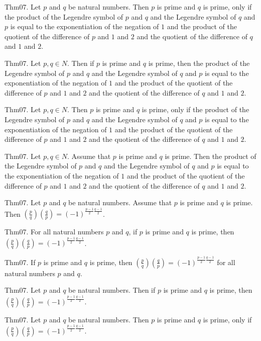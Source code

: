\documentclass{article}
\begin{document}
Thm07. Let $p$ and $q$ be natural numbers. Then $p$ is prime and $q$ is prime, only if the product of the Legendre symbol of $p$ and $q$ and the Legendre symbol of $q$ and $p$ is equal to the exponentiation of the negation of $1$ and the product of the quotient of the difference of $p$ and $1$ and $2$ and the quotient of the difference of $q$ and $1$ and $2$.

Thm07. Let $p , q \in N$. Then if $p$ is prime and $q$ is prime, then the product of the Legendre symbol of $p$ and $q$ and the Legendre symbol of $q$ and $p$ is equal to the exponentiation of the negation of $1$ and the product of the quotient of the difference of $p$ and $1$ and $2$ and the quotient of the difference of $q$ and $1$ and $2$.

Thm07. Let $p , q \in N$. Then $p$ is prime and $q$ is prime, only if the product of the Legendre symbol of $p$ and $q$ and the Legendre symbol of $q$ and $p$ is equal to the exponentiation of the negation of $1$ and the product of the quotient of the difference of $p$ and $1$ and $2$ and the quotient of the difference of $q$ and $1$ and $2$.

Thm07. Let $p , q \in N$. Assume that $p$ is prime and $q$ is prime. Then the product of the Legendre symbol of $p$ and $q$ and the Legendre symbol of $q$ and $p$ is equal to the exponentiation of the negation of $1$ and the product of the quotient of the difference of $p$ and $1$ and $2$ and the quotient of the difference of $q$ and $1$ and $2$.

Thm07. Let $p$ and $q$ be natural numbers. Assume that $p$ is prime and $q$ is prime. Then $\left(\frac{ p }{ q }\right) \left(\frac{ q }{ p }\right) = (- 1)^ {\frac{ p - 1}{2}\frac{ q - 1}{2}}$.

Thm07. For all natural numbers $p$ and $q$, if $p$ is prime and $q$ is prime, then $\left(\frac{ p }{ q }\right) \left(\frac{ q }{ p }\right) = (- 1)^ {\frac{ p - 1}{2}\frac{ q - 1}{2}}$.

Thm07. If $p$ is prime and $q$ is prime, then $\left(\frac{ p }{ q }\right) \left(\frac{ q }{ p }\right) = (- 1)^ {\frac{ p - 1}{2}\frac{ q - 1}{2}}$ for all natural numbers $p$ and $q$.

Thm07. Let $p$ and $q$ be natural numbers. Then if $p$ is prime and $q$ is prime, then $\left(\frac{ p }{ q }\right) \left(\frac{ q }{ p }\right) = (- 1)^ {\frac{ p - 1}{2}\frac{ q - 1}{2}}$.

Thm07. Let $p$ and $q$ be natural numbers. Then $p$ is prime and $q$ is prime, only if $\left(\frac{ p }{ q }\right) \left(\frac{ q }{ p }\right) = (- 1)^ {\frac{ p - 1}{2}\frac{ q - 1}{2}}$.
\end{document}
